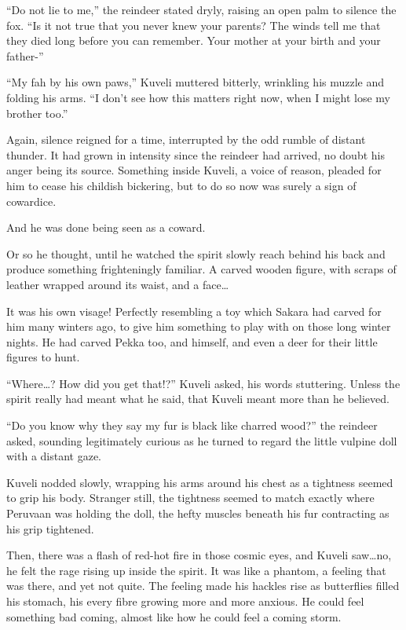 ``Do not lie to me,'' the reindeer stated dryly, raising an open palm to silence the fox. ``Is it not true that you never knew your parents? The winds tell me that they died long before you can remember. Your mother at your birth and your father-''

``My fah by his own paws,'' Kuveli muttered bitterly, wrinkling his muzzle and folding his arms. ``I don't see how this matters right now, when I might lose my brother too.''

Again, silence reigned for a time, interrupted by the odd rumble of distant thunder. It had grown in intensity since the reindeer had arrived, no doubt his anger being its source. Something inside Kuveli, a voice of reason, pleaded for him to cease his childish bickering, but to do so now was surely a sign of cowardice.

And he was done being seen as a coward.

Or so he thought, until he watched the spirit slowly reach behind his back and produce something frighteningly familiar. A carved wooden figure, with scraps of leather wrapped around its waist, and a face\ldots{}

It was his own visage! Perfectly resembling a toy which Sakara had carved for him many winters ago, to give him something to play with on those long winter nights. He had carved Pekka too, and himself, and even a deer for their little figures to hunt.

``Where\ldots? How did you get that!?'' Kuveli asked, his words stuttering. Unless the spirit really had meant what he said, that Kuveli meant more than he believed.

``Do you know why they say my fur is black like charred wood?'' the reindeer asked, sounding legitimately curious as he turned to regard the little vulpine doll with a distant gaze.

Kuveli nodded slowly, wrapping his arms around his chest as a tightness seemed to grip his body. Stranger still, the tightness seemed to match exactly where Peruvaan was holding the doll, the hefty muscles beneath his fur contracting as his grip tightened.

Then, there was a flash of red-hot fire in those cosmic eyes, and Kuveli saw\ldots{}no, he felt the rage rising up inside the spirit. It was like a phantom, a feeling that was there, and yet not quite. The feeling made his hackles rise as butterflies filled his stomach, his every fibre growing more and more anxious. He could feel something bad coming, almost like how he could feel a coming storm.

